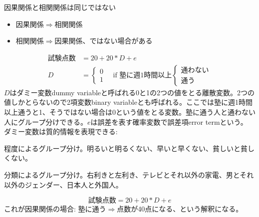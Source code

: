 \begin{frame}{}
因果関係と相関関係は同じではない
\begin{itemize}
\vspace{1.0ex}\setlength{\itemsep}{1.0ex}\setlength{\baselineskip}{12pt}
\pause
\item	因果関係$\Rightarrow$相関関係
\pause
\item	相関関係$\Rightarrow$因果関係、ではない場合がある
\end{itemize}
\pause

\[
\begin{aligned}
\mbox{試験点数}&=20+20*D+e\\
D&=
\left\{
\begin{array}{c}
0\\
1
\end{array}
\right. \quad \mbox{if 塾に週1時間以上}
\left\{
\begin{array}{l}
\mbox{通わない}\\
\mbox{通う}
\end{array}
\right.
\end{aligned}
\]
$D$はダミー変数dummy variableと呼ばれる0と1の2つの値をとる離散変数。2つの値しかとらないので2項変数binary variableとも呼ばれる。ここでは塾に週1時間以上通うと1、そうではない場合は0という値をとる変数。塾に通う人と通わない人にグループ分けできる。$e$は誤差を表す確率変数で誤差項error termという。\\

\pause
\vspace{1ex}
ダミー変数は質的情報を表現できる: 
\begin{description}
\vspace{1.0ex}\setlength{\itemsep}{1.0ex}\setlength{\baselineskip}{12pt}
\pause
\item[背景に連続変数がある]	程度によるグループ分け。明るいと明るくない、早いと早くない、貧しいと貧しくない。
\pause
\item[背景に連続変数がない]	分類によるグループ分け。右利きと左利き、テレビとそれ以外の家電、男とそれ以外のジェンダー、日本人と外国人。
\end{description}
\end{frame}

\begin{frame}{}
\[
\mbox{試験点数}=20+20*D+e
\]
\pause
これが因果関係の場合: 塾に通う$\Rightarrow$点数が40点になる、という解釈になる。\\~\\
\pause
\vspace{1ex}
\hfil{}
\end{frame}

